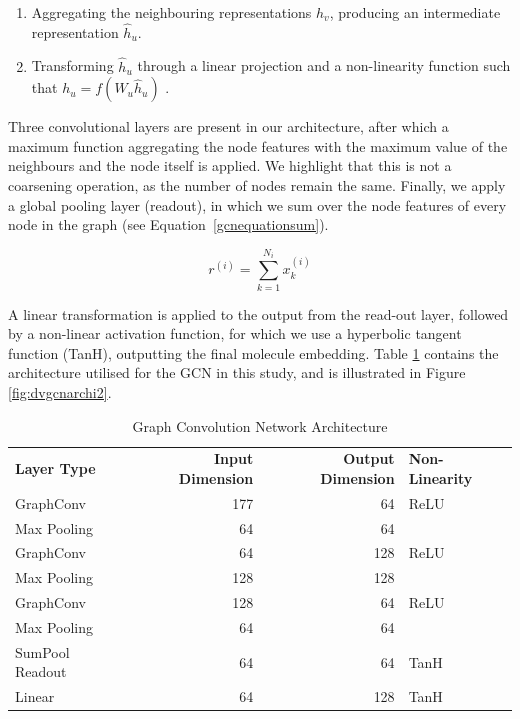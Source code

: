 \begin{enumerate}
	\item Aggregating the neighbouring representations $h_v$, producing an intermediate representation $\hat{h}_u$.
	\item Transforming $\hat{h}_u$ through a linear projection and a non-linearity function such that $h_u = f(W_u \hat{h}_u)$ \citep{kipf2016semi}.
\end{enumerate}

Three convolutional layers are present in our architecture, after which a maximum function aggregating the node features with the maximum value of the neighbours and the node itself is applied. We highlight that this is not a coarsening operation, as the number of nodes remain the same. Finally, we apply a global pooling layer (readout), in which we sum over the node features of every node in the graph (see Equation~\ref{gcnequationsum}). 

\begin{equation}
	\label{gcnequationsum}
	r^{(i)} = \sum_{k=1}^{N_i} x^{(i)}_k
\end{equation}

A linear transformation is applied to the output from the read-out layer, followed by a non-linear activation function, for which we use a hyperbolic tangent function (TanH), outputting the final molecule embedding. Table \ref{table:gcn-architecture} contains the architecture utilised for the GCN in this study, and is illustrated in Figure \ref{fig:dvgcnarchi2}.

\begin{table}
	\centering
	\begin{tabular}{@{}lrrl@{}}
	\textbf{Layer Type} & \textbf{Input Dimension} & \textbf{Output Dimension} & \textbf{Non-Linearity} \\
	GraphConv & 177 & 64 & ReLU \\
	Max Pooling & 64 & 64 & \\
	GraphConv & 64 & 128 & ReLU \\
	Max Pooling & 128 & 128 & \\
	GraphConv & 128 & 64 & ReLU \\
	Max Pooling & 64 & 64 & \\
	SumPool Readout & 64 & 64 & TanH \\
	Linear & 64 & 128 & TanH \\
	\end{tabular}
	\caption{Graph Convolution Network Architecture}
	\label{table:gcn-architecture}
\end{table}

